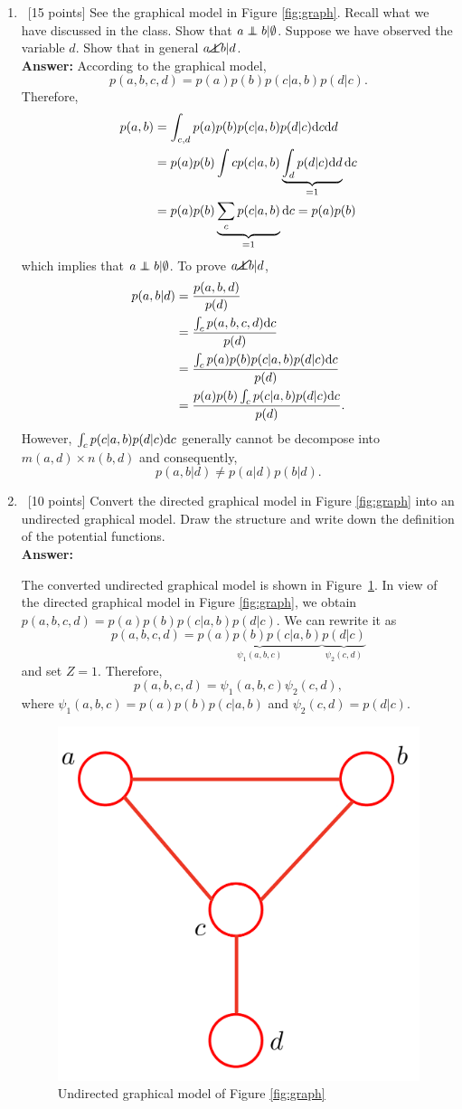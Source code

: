 \documentclass[12pt, fullpage,letterpaper]{article}
\def\red{\color{black!30!red}}
\def\blackblue{\color{black!40!blue}}
\newcommand\independent{\protect\mathpalette{\protect\independenT}{\perp}}
\def\independenT#1#2{\mathrel{\rlap{$#1#2$}\mkern2mu{#1#2}}}
\begin{document}
\begin{enumerate}
\item~[15 points] See the graphical model in Figure \ref{fig:graph}. Recall what we have discussed in the class. Show that $a \independent b | \emptyset $. Suppose we have observed the variable $d$. Show that in general $a \cancel{ \independent} b | d$.\\
{\bf \red Answer: }{\blackblue 
According to the graphical model, 
$$p(a,b,c,d)=p(a)p(b)p(c|a,b)p(d|c).$$
Therefore, 
\begin{align*}
p(a,b) & = \int_{c,d}p(a)p(b)p(c|a,b)p(d|c){\rm d} c{\rm d} d\\
& = p(a)p(b)\int{c}p(c|a,b)\underbrace{\int_{d}p(d|c){\rm d} d}_{= 1}{\rm d} c\\
& = p(a)p(b)\underbrace{\sum_{c}p(c|a,b)}_{=1}{\rm d} c = p(a)p(b)
\end{align*}
which implies that $a \independent b | \emptyset$. 
To prove $a \cancel{ \independent} b | d$, 
\begin{align*}
p(a,b|d) & = \frac{p(a,b,d)}{p(d)}\\
& = \frac{\int_{c} p(a,b,c,d){\rm d} c}{p(d)}\\
& = \frac{\int_{c}p(a)p(b)p(c|a,b)p(d|c){\rm d} c}{p(d)}\\
& = \frac{p(a)p(b)\int_{c}p(c|a,b)p(d|c){\rm d} c}{p(d)}.
\end{align*}
However, $\int_{c}p(c|a,b)p(d|c){\rm d} c$ generally cannot be decompose into $m(a,d)\times n(b,d)$ and consequently, 
$$p(a,b|d) \neq p(a|d)p(b|d).$$
}
\item~[10  points] Convert the directed graphical model in Figure \ref{fig:graph} into an undirected graphical model. Draw the structure and write down the definition of the potential functions. \\
{\bf \red Answer: }{\blackblue 
The converted undirected graphical model is shown in Figure~\ref{fig:graph2_und}. 
In view of the directed graphical model in Figure \ref{fig:graph}, we obtain  
$p(a,b,c,d) = p(a)p(b)p(c|a,b)p(d|c)$. We can rewrite it as  
$$p(a,b,c,d) = \underbrace{p(a)p(b)p(c|a,b)}_{\psi_1(a,b,c)}\underbrace{p(d|c)}_{\psi_2(c,d)}$$
and set $Z=1$. Therefore, 
$$p(a,b,c,d) = \psi_1(a,b,c)\psi_2(c,d),$$
where $\psi_1(a,b,c)=p(a)p(b)p(c|a,b)$ and $\psi_2(c,d)=p(d|c).$
\begin{figure}[h]
	\centering
	\includegraphics[width=0.4\linewidth]{./fig1_und.pdf} 
	\caption{Undirected graphical model of Figure \ref{fig:graph}} \label{fig:graph2_und}
\end{figure}
}



\end{enumerate}
\end{document}
